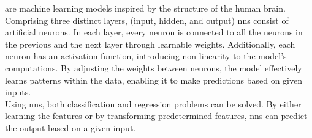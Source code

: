  are machine learning models inspired by the structure of the human brain. Comprising three distinct layers, (input, hidden, and output) \glspl{nn} consist of artificial neurons. In each layer, every neuron is connected to all the neurons in the previous and the next layer through learnable weights. Additionally, each neuron has an \gls{activation function}, introducing non-linearity to the model's computations. By adjusting the weights between neurons, the model effectively learns patterns within the data, enabling it to make predictions based on given inputs.\\
Using \glspl{nn}, both classification and regression problems can be solved. By either learning the features or by transforming predetermined features, \glspl{nn} can predict the output based on a given input.
